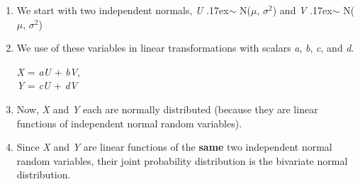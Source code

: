 \documentclass[12pt]{report}
\begin{document}
\begin{enumerate}

\item We start with two independent normals, \textit{U} {\raise.17ex\hbox{$\scriptstyle\sim$}} N($\mu$, $\sigma^{2}$) and \textit{V} {\raise.17ex\hbox{$\scriptstyle\sim$}} N($\mu$, $\sigma^{2}$)

\item We use of these variables in linear transformations with scalars \textit{a}, \textit{b}, \textit{c}, and \textit{d}. 

\textit{X} = \textit{aU} + \textit{bV}, \\
\textit{Y} = \textit{cU} + \textit{dV} \\

\item Now, \textit{X} and \textit{Y} each are normally distributed (because they are linear functions of  independent normal random variables). 

\item Since \textit{X} and \textit{Y} are linear functions of the \textbf{same} two independent normal random variables, their joint probability distribution is the bivariate normal distribution. 

\end{enumerate}
\end{document}
